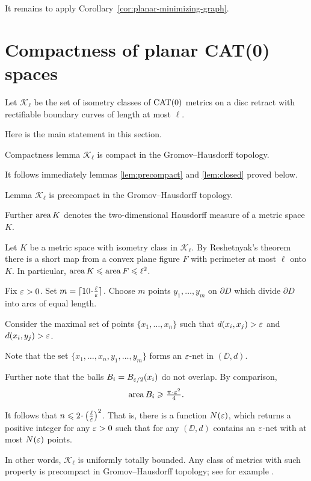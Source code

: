 \documentclass[a4paper,10pt]{amsart}
\begin{document}
It remains to apply Corollary~\ref{cor:planar-minimizing-graph}.
\qeds

\section{Compactness of planar CAT(0) spaces}

Let $\mathcal{K}_\ell$ be the set of isometry classes of $\mathop{\rm CAT}\nolimits(0)$ metrics on a disc retract with rectifiable
boundary curves of length at most $\ell$.


Here is the main statement in this section.

\begin{thm}{Compactness lemma}\label{lem:compact}
$\mathcal{K}_\ell$ is compact in the Gromov--Hausdorff topology.
\end{thm}

It follows immediately lemmas \ref{lem:precompact} and \ref{lem:closed} proved below.

\begin{thm}{Lemma}\label{lem:precompact}
$\mathcal{K}_\ell$ is precompact in the Gromov--Hausdorff topology.
\end{thm}

Further $\mathop{\rm area}\nolimits K$ denotes the two-dimensional Hausdorff measure of a metric space $K$. 

Let $K$ be a metric space with isometry class in $\mathcal {K}_\ell$.
By Reshetnyak's theorem there is a short map from a convex plane figure $F$ with perimeter at most $\ell$ onto $K$.
In particular, $\mathop{\rm area}\nolimits K \leqslant \mathop{\rm area}\nolimits F 
\leqslant \ell^2$.

Fix $\varepsilon>0$. 
Set $m=\lceil 10\cdot\tfrac\ell\eps\rceil$.
Choose $m$ points $y_1,\dots,y_m$ on $\partial D$
which divide $\partial D$ into arcs of equal length.

Consider the maximal set of points $\{x_1,\dots,x_n\}$ such that $d(x_i,x_j)>\varepsilon$ and $d(x_i,y_j)>\varepsilon$.

Note that the set $\{x_1,\dots,x_n,y_1,\dots,y_m\}$
forms an $\varepsilon$-net in $(\DD,d)$.

Further note that the balls $B_i=B_{\varepsilon/2}(x_i)$
do not overlap.
By comparison,
\[\area B_i\ge \tfrac{\pi\cdot\eps^2}{4}.\]

It follows that $n\le 2\cdot\left(\tfrac\ell\eps\right)^2$.
That is, there is a function $N(\varepsilon)$,
which returns a positive integer for any $\varepsilon>0$
such that for any 
$(\DD,d)$ contains an $\varepsilon$-net
with at most $N(\varepsilon)$ points.

In other words, $\mathcal{K}_\ell$ is uniformly totally bounded.
Any class of metrics with such property is precompact in Gromov--Hausdorff topology; 
see for example \cite[7.4.15]{BBI}.
\qeds
\end{document}
